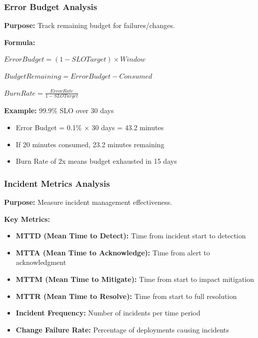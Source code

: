 \documentclass[11pt,letterpaper]{article}
\begin{document}
\subsubsection{Error Budget Analysis}

\begin{definitionbox}
\textbf{Purpose:} Track remaining budget for failures/changes.

\textbf{Formula:}
\begin{center}
$Error Budget = (1 - SLO Target) \times Window$

$Budget Remaining = Error Budget - Consumed$

$Burn Rate = \frac{Error Rate}{1 - SLO Target}$
\end{center}

\textbf{Example:} 99.9\% SLO over 30 days
\begin{itemize}[nosep]
    \item Error Budget = 0.1\% × 30 days = 43.2 minutes
    \item If 20 minutes consumed, 23.2 minutes remaining
    \item Burn Rate of 2x means budget exhausted in 15 days
\end{itemize}
\end{definitionbox}

\subsubsection{Incident Metrics Analysis}

\begin{definitionbox}
\textbf{Purpose:} Measure incident management effectiveness.

\textbf{Key Metrics:}
\begin{itemize}[nosep]
    \item \textbf{MTTD (Mean Time to Detect):} Time from incident start to detection
    \item \textbf{MTTA (Mean Time to Acknowledge):} Time from alert to acknowledgment
    \item \textbf{MTTM (Mean Time to Mitigate):} Time from start to impact mitigation
    \item \textbf{MTTR (Mean Time to Resolve):} Time from start to full resolution
    \item \textbf{Incident Frequency:} Number of incidents per time period
    \item \textbf{Change Failure Rate:} Percentage of deployments causing incidents
\end{itemize}
\end{definitionbox}
\end{document}
